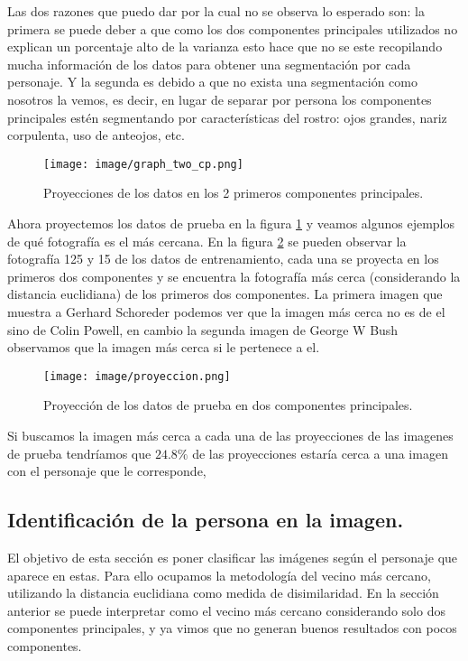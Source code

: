 \documentclass[paper=letter, fontsize=11pt]{scrartcl}
\numberwithin{equation}{section} %
\numberwithin{figure}{section} %
\numberwithin{table}{section} %
\begin{document}
Las dos razones que puedo dar por la cual no se observa lo esperado son: la primera se puede deber a que como los dos componentes principales utilizados no explican un porcentaje alto de la varianza esto hace que no se este recopilando mucha información de los datos para obtener una segmentación por cada personaje. Y la segunda es debido a que no exista una segmentación como nosotros la vemos, es decir, en lugar de separar por persona los componentes principales estén segmentando por características del rostro: ojos grandes, nariz corpulenta, uso de anteojos, etc.
\begin{figure}[H]
    \centering
    \texttt{[image: image/graph\_two\_cp.png]}
    \caption{Proyecciones de los datos en los 2 primeros componentes principales.}
    \label{fig:graph_two_cp}
\end{figure}
Ahora proyectemos los datos de prueba en la figura \ref{fig:graph_two_cp} y veamos algunos ejemplos de qué fotografía es el más cercana. En la figura \ref{fig:proyeccion} se pueden observar la fotografía 125 y 15 de los datos de entrenamiento, cada una se proyecta en los primeros dos componentes y se encuentra la fotografía más cerca (considerando la distancia euclidiana) de los primeros dos componentes. La primera imagen que muestra a Gerhard Schoreder podemos ver que la imagen más cerca no es de el sino de Colin Powell, en cambio la segunda imagen de George W Bush observamos que la imagen más cerca si le pertenece a el.  
\begin{figure}[H]
    \centering
    \texttt{[image: image/proyeccion.png]}
    \caption{Proyección de los datos de prueba en dos componentes principales.}
    \label{fig:proyeccion}
\end{figure}
Si buscamos la imagen más cerca a cada una de las proyecciones de las imagenes de prueba tendríamos que $24.8\%$ de las proyecciones estaría cerca a una imagen con el personaje que le corresponde,  

\subsection{Identificación de la persona en la imagen.}
El objetivo de esta sección es poner clasificar las imágenes según el personaje que aparece en estas. Para ello ocupamos la metodología del vecino más cercano, utilizando la distancia euclidiana como medida de disimilaridad. En la sección anterior se puede interpretar como el vecino más cercano considerando solo dos componentes principales, y ya vimos que no generan buenos resultados con pocos componentes. \\
\end{document}
